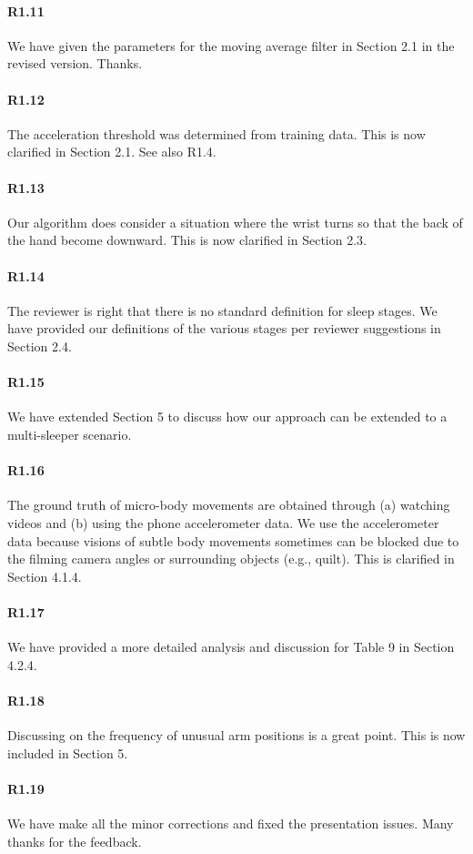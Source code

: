 \paragraph{R1.11} We have given the parameters for the moving average filter in Section 2.1 in the revised version. Thanks.

\paragraph{R1.12} The acceleration threshold was determined from training data. This is now clarified in Section 2.1. See also
R1.4.

\paragraph{R1.13} Our algorithm does consider a situation where the wrist turns so that the back of the hand become downward. This is now clarified in Section 2.3.

\paragraph{R1.14} The reviewer is right that there is no standard definition for sleep stages. We have provided our definitions of the various stages per reviewer suggestions in Section 2.4.

\paragraph{R1.15} We have extended Section 5 to discuss how our approach can be extended to a multi-sleeper scenario.

\paragraph{R1.16} The ground truth of micro-body movements are obtained through (a) watching videos and (b) using the phone accelerometer data. We use the accelerometer data because visions of subtle body movements sometimes can be blocked due to the filming camera angles or surrounding objects (e.g., quilt). This is clarified in Section 4.1.4.

\paragraph{R1.17} We have provided a more detailed analysis and discussion for Table 9 in Section 4.2.4.

\paragraph{R1.18} Discussing on the frequency of unusual arm positions is a great point. This is now included in Section 5.

\paragraph{R1.19} We have make all the minor corrections and fixed the presentation issues. Many thanks for the feedback.
